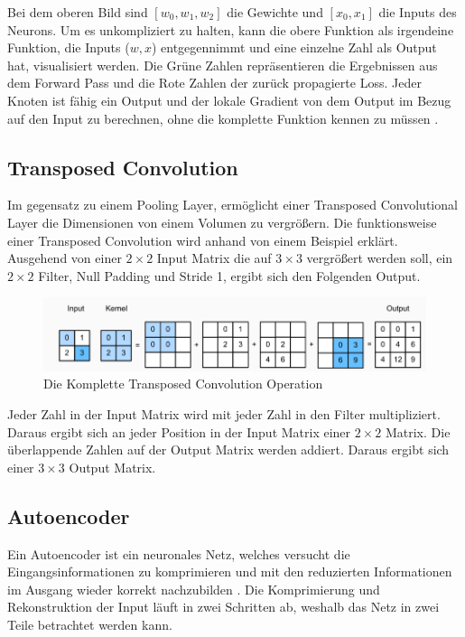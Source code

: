Bei dem oberen Bild sind $ [w_0, w_1, w_2] $ die Gewichte und $ [x_0, x_1] $ die Inputs des Neurons. Um es unkompliziert zu halten, kann die 
obere Funktion als irgendeine Funktion, die Inputs ($w, x$) entgegennimmt und eine einzelne Zahl als Output hat, visualisiert werden. 
Die Grüne Zahlen repräsentieren die Ergebnissen aus dem Forward Pass und die Rote Zahlen der zurück propagierte Loss. Jeder Knoten ist fähig 
ein Output und der lokale Gradient von dem Output im Bezug auf den Input zu berechnen, ohne die komplette Funktion kennen zu müssen \cite{cs231-backpropagation}.

\subsection{Transposed Convolution}
Im gegensatz zu einem Pooling Layer, ermöglicht einer Transposed Convolutional Layer die Dimensionen von einem Volumen zu vergrößern. 
Die funktionsweise einer Transposed Convolution wird anhand von einem Beispiel erklärt. 
\\
Ausgehend von einer $ 2 \times 2 $ Input Matrix die auf $ 3 \times 3 $ vergrößert werden soll, ein $ 2 \times 2 $ Filter, 
Null Padding und Stride 1, ergibt sich den Folgenden Output. 

\begin{figure}[H]
  \centering
  \includegraphics[width=1\textwidth]{resources/cnn/transposed-conv.png}
  \caption{
    Die Komplette Transposed Convolution Operation
    \cite{zhang2020dive}
  }
  \label{image:transposed-conv}
\end{figure}

Jeder Zahl in der Input Matrix wird mit jeder Zahl in den Filter multipliziert. Daraus ergibt sich an jeder Position in der Input Matrix einer 
$ 2 \times 2 $ Matrix. Die überlappende Zahlen auf der Output Matrix werden addiert. Daraus ergibt sich einer $ 3 \times 3 $ Output Matrix.

\subsection{Autoencoder}
Ein Autoencoder ist ein neuronales Netz, welches versucht die Eingangsinformationen zu komprimieren und mit den reduzierten Informationen 
im Ausgang wieder korrekt nachzubilden \cite{was-ist-autoencoder}. Die Komprimierung und Rekonstruktion der Input läuft in zwei Schritten ab, 
weshalb das Netz in zwei Teile betrachtet werden kann.
\\
